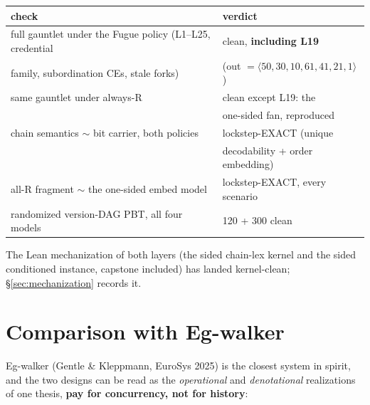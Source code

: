 \documentclass[11pt]{article}
\begin{document}
\begin{center}\small
\begin{tabular}{@{}ll@{}}
\toprule
check & verdict \\
\midrule
full gauntlet under the Fugue policy (L1--L25, credential & clean,
  \textbf{including L19} \\
\quad family, subordination CEs, stale forks) &
  (out $= \langle 50,30,10,61,41,21,1\rangle$) \\
same gauntlet under always-R & clean except L19: the \\
 & one-sided fan, reproduced \\
chain semantics $\sim$ bit carrier, both policies & lockstep-EXACT
  (unique \\
 & decodability + order embedding) \\
all-R fragment $\sim$ the one-sided embed model & lockstep-EXACT, every
  scenario \\
randomized version-DAG PBT, all four models & 120 + 300 clean \\
\bottomrule
\end{tabular}
\end{center}

\noindent The Lean mechanization of both layers (the sided chain-lex
kernel and the sided conditioned instance, capstone included) has
landed kernel-clean; \S\ref{sec:mechanization} records it.

\section{Comparison with Eg-walker}
\label{sec:egwalker}

Eg-walker (Gentle \& Kleppmann, EuroSys 2025) is the closest system in
spirit, and the two designs can be read as the \emph{operational} and
\emph{denotational} realizations of one thesis, \textbf{pay for
concurrency, not for history}:
\end{document}
